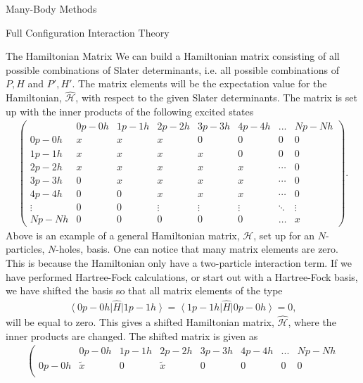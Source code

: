 \documentclass[twoside,english]{uiofysmaster}
\begin{document}
\begin{chapter}{Many-Body Methods}
\begin{section}{Full Configuration Interaction Theory}
		\begin{subsection}{The Hamiltonian Matrix}
			We can build a Hamiltonian matrix consisting of all possible combinations of Slater determinants, i.e. all possible combinations of $P,H$ and $P',H'$. The matrix elements will be the expectation value for the Hamiltonian, $\hat{\mathcal{H}}$, with respect to the given Slater determinants. The matrix is set up with the inner products of the following excited states
			\begin{align}
				\begin{pmatrix}
							& 0p - 0h & 1p - 1h & 2p - 2h & 3p - 3h & 4p-4h & ... & Np - Nh \\ 
					0p - 0h & x 	  & x 		& x 	  & 0 		& 0 	& 0	   & 0 		\\		
					1p - 1h & x 	  & x 		& x 	  & x  		& 0 	& 0    & 0 		\\
					2p - 2h & x 	  & x 		& x 	  & x  		& x		&\cdots& 0		\\
					3p - 3h & 0 	  & x 		& x 	  & x  		& x 	&\cdots& 0 		\\
					4p - 4h & 0		  & 0 		& x 	  & x 		& x 	&\cdots& 0		\\
					\vdots 	& 0  	  & 0 	    & \vdots  & \vdots  & \vdots&\ddots& \vdots \\
					Np - Nh & 0 	  & 0		& 0 	  & 0 		& 0		&\hdots& x
				\end{pmatrix}. 
			\end{align}
			Above is an example of a general Hamiltonian matrix, $\mathcal{H}$, set up for an $N$-particles, $N$-holes, basis. One can notice that many matrix elements are zero. This is because the Hamiltonian only have a two-particle interaction term. If we have performed Hartree-Fock calculations, or start out with a Hartree-Fock basis, we have shifted the basis so that all matrix elements of the type
			\begin{align}
				\left< 0p-0h \right| \hat H \left| 1p-1h \right> = \left< 1p-1h \right| \hat H \left| 0p-0h \right> = 0, 
			\end{align}
			will be equal to zero. This gives a shifted Hamiltonian matrix, $\hat{\mathcal{H}}$, where the inner products are changed. The shifted matrix is given as 
			\begin{align}
				\left(  \begin{matrix}
							& 0p - 0h & 1p - 1h & 2p - 2h & 3p - 3h & 4p - 4h & ... & Np - Nh \\ 
					0p - 0h & \tilde x& 0       & \tilde x& 0 		& 0 	  & 0	 & 0 		\\		

\end{matrix}
\end{align}
\end{subsection}
\end{section}
\end{chapter}
\end{document}
